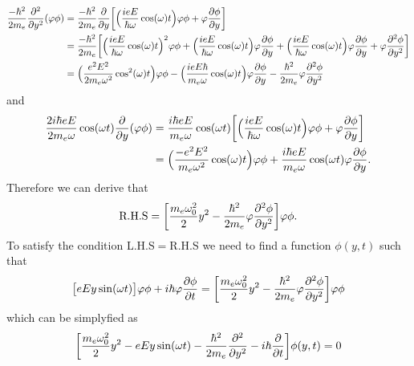 \documentclass[a4paper]{article}
\numberwithin{equation}{subsection}
\numberwithin{equation}{section}
\begin{document}
\begin{equation} \label{1.25}
  \begin{aligned}
    \frac{-\hbar^2}{2m_e}\pdv[2]{y}(\varphi\phi) & =
    \frac{-\hbar^2}{2m_e} \pdv{y}\bigg[
      \Big(\frac{ieE}{\hbar \omega} \cos(\omega)t\Big)\varphi\phi +
      \varphi\pdv{\phi}{y}
    \bigg] \\
    & =
    \frac{-\hbar^2}{2m_e} \bigg[
      \Big(\frac{ieE}{\hbar \omega} \cos(\omega)t\Big)^2\varphi\phi +
      \Big(\frac{ieE}{\hbar \omega} \cos(\omega)t\Big)\varphi\pdv{\phi}{y} +
      \Big(\frac{ieE}{\hbar \omega} \cos(\omega)t\Big)\varphi\pdv{\phi}{y} +
      \varphi\pdv[2]{\phi}{y}
    \bigg] \\
    & =
    \Big(\frac{e^2E^2}{ 2m_e\omega^2} \cos[2](\omega)t\Big)\varphi\phi -
    \Big(\frac{ieE \hbar}{m_e\omega} \cos(\omega)t\Big)\varphi\pdv{\phi}{y} -
    \frac{\hbar^2}{2m_e}
    \varphi\pdv[2]{\phi}{y}
  \end{aligned}
\end{equation}
and
\begin{equation} \label{1.26}
  \begin{aligned}
    \frac{2i\hbar eE}{2m_e\omega}\cos(\omega t) \pdv{y} (\varphi\phi)& =
    \frac{i\hbar eE}{m_e\omega}\cos(\omega t)
    \bigg[
      \Big(\frac{ieE}{\hbar \omega} \cos(\omega)t\Big)\varphi\phi +
      \varphi\pdv{\phi}{y}
    \bigg] \\
    & =
    \Big(\frac{-e^2E^2}{m_e\omega^2} \cos(\omega)t\Big)\varphi\phi +
    \frac{i\hbar eE}{m_e\omega}\cos(\omega t)\varphi\pdv{\phi}{y}.
  \end{aligned}
\end{equation}
Therefore we can derive that
\begin{equation} \label{1.27}
  \begin{aligned}
    \text{R.H.S} =
    \bigg[
    \frac{m_e \omega_0^2}{2}y^2
    -
    \frac{\hbar^2}{2m_e}
    \varphi\pdv[2]{\phi}{y} \bigg]
    \varphi\phi.
  \end{aligned}
\end{equation}
To satisfy the condition L.H.S$=$R.H.S we need to find a function $\phi(y,t)$ such that
\begin{equation} \label{1.28}
  \begin{aligned}
    \big[{eEy}\sin(\omega t)\big]\varphi\phi +
    i \hbar\varphi  \pdv{\phi}{t}
    =
    \bigg[
    \frac{m_e \omega_0^2}{2}y^2
    -
    \frac{\hbar^2}{2m_e}
    \varphi\pdv[2]{\phi}{y} \bigg]
    \varphi\phi
  \end{aligned}
\end{equation}
which can be simplyfied as
\begin{equation} \label{1.29}
  \begin{aligned}
    \bigg[
    \frac{m_e \omega_0^2}{2}y^2
    - {eEy}\sin(\omega t)
    -
    \frac{\hbar^2}{2m_e}
    \pdv[2]{y}
    - i \hbar \pdv{t}
    \bigg]
    \phi(y,t) = 0
  \end{aligned}
\end{equation}
\end{document}
